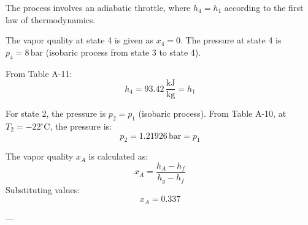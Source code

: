 The process involves an adiabatic throttle, where \( h_4 = h_1 \) according to the first law of thermodynamics.  

The vapor quality at state 4 is given as \( x_4 = 0 \). The pressure at state 4 is \( p_4 = 8 \, \text{bar} \) (isobaric process from state 3 to state 4).  

From Table A-11:  
\[
h_4 = 93.42 \, \frac{\text{kJ}}{\text{kg}} = h_1
\]  

For state 2, the pressure is \( p_2 = p_1 \) (isobaric process). From Table A-10, at \( T_2 = -22^\circ\text{C} \), the pressure is:  
\[
p_2 = 1.21926 \, \text{bar} = p_1
\]  

The vapor quality \( x_A \) is calculated as:  
\[
x_A = \frac{h_A - h_f}{h_g - h_f}
\]  
Substituting values:  
\[
x_A = 0.337
\]  

---